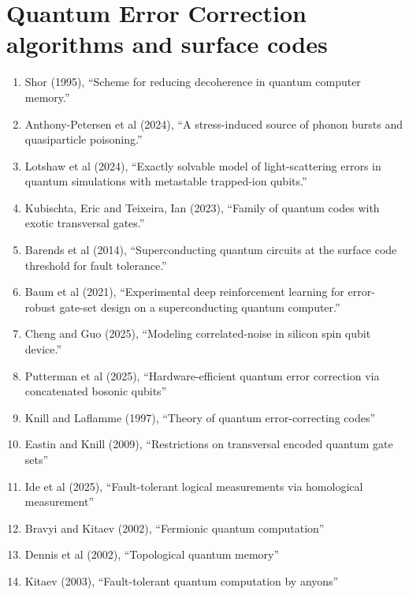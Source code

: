 \documentclass[]{article}
\begin{document}
\section{Quantum Error Correction algorithms and surface codes}

\begin{enumerate}
\item Shor (1995)\cite{shor1995scheme}, ``Scheme for reducing decoherence in quantum computer memory.''
\item Anthony-Petersen et al (2024)\cite{anthony2024stress}, ``A stress-induced source of phonon bursts and quasiparticle poisoning.''
\item Lotshaw et al (2024)\cite{PhysRevA.110.L030803}, ``Exactly solvable model of light-scattering errors in quantum simulations with metastable trapped-ion qubits.''
\item Kubischta, Eric and Teixeira, Ian (2023)\cite{kubischta2023family}, ``Family of quantum codes with exotic transversal gates.''
\item Barends et al (2014)\cite{barends2014superconducting}, ``Superconducting quantum circuits at the surface code threshold for fault tolerance.''
\item Baum et al (2021)\cite{baum2021experimental}, ``Experimental deep reinforcement learning for error-robust gate-set design on a superconducting quantum computer.''
\item Cheng and Guo (2025)\cite{cheng2025modeling}, ``Modeling correlated-noise in silicon spin qubit device.''
\item Putterman et al (2025)\cite{Putterman_2025}, ``Hardware-efficient quantum error correction via concatenated bosonic qubits''
\item Knill and Laflamme (1997)\cite{knill1997theory}, ``Theory of quantum error-correcting codes''
\item Eastin and Knill (2009)\cite{eastin2009restrictions}, ``Restrictions on transversal encoded quantum gate sets''
\item Ide et al (2025)\cite{ide2025fault}, ``Fault-tolerant logical measurements via homological measurement''
\item Bravyi and Kitaev (2002)\cite{bravyi2002fermionic}, ``Fermionic quantum computation''
\item Dennis et al (2002)\cite{dennis2002topological}, ``Topological quantum memory''
\item Kitaev (2003)\cite{kitaev2003fault}, ``Fault-tolerant quantum computation by anyons''

\end{enumerate}
\end{document}
